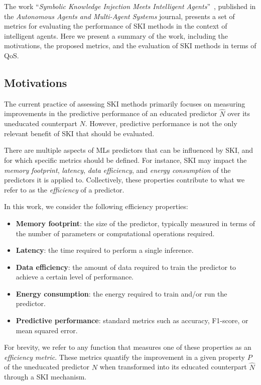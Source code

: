 The work ``\emph{Symbolic Knowledge Injection Meets Intelligent Agents}''~\cite{DBLP:journals/aamas/AgiolloRMCO23}, published in the \emph{Autonomous Agents and Multi-Agent Systems} journal, presents a set of metrics for evaluating the performance of \gls{SKI} methods in the context of intelligent agents.
%
Here we present a summary of the work, including the motivations, the proposed metrics, and the evaluation of \gls{SKI} methods in terms of \gls{QoS}.


\subsection{Motivations}\label{subsec:ski-meets-intelligent-agents-motivations}
%
The current practice of assessing \gls{SKI} methods primarily focuses on measuring improvements in the predictive performance of an educated predictor \(\hat{N}\) over its uneducated counterpart \(N\).
%
However, predictive performance is not the only relevant benefit of \gls{SKI} that should be evaluated.

There are multiple aspects of \glspl{ML} predictors that can be influenced by \gls{SKI}, and for which specific metrics should be defined.
%
For instance, \gls{SKI} may impact the \emph{memory footprint}, \emph{latency}, \emph{data efficiency}, and \emph{energy consumption} of the predictors it is applied to.
%
Collectively, these properties contribute to what we refer to as the \emph{efficiency} of a predictor.

In this work, we consider the following efficiency properties:
%
\begin{itemize}
    \item \textbf{Memory footprint}: the size of the predictor, typically measured in terms of the number of parameters or computational operations required.
    \item \textbf{Latency}: the time required to perform a single inference.
    \item \textbf{Data efficiency}: the amount of data required to train the predictor to achieve a certain level of performance.
    \item \textbf{Energy consumption}: the energy required to train and/or run the predictor.
    \item \textbf{Predictive performance}: standard metrics such as accuracy, F1-score, or mean squared error.
\end{itemize}

For brevity, we refer to any function that measures one of these properties as an \emph{efficiency metric}.
%
These metrics quantify the improvement in a given property \(P\) of the uneducated predictor \(N\) when transformed into its educated counterpart \(\hat{N}\) through a \gls{SKI} mechanism.


